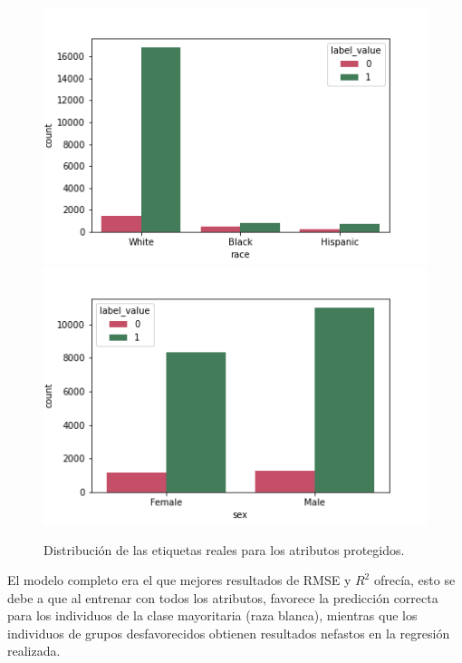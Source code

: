 \documentclass[oneside,openright,titlepage,numbers=noenddot,openany,headinclude,footinclude=true,
cleardoublepage=empty,abstractoff,BCOR=5mm,paper=a4,fontsize=12pt,main=spanish]{scrreprt}
\begin{document}
\begin{figure}[h]
      \includegraphics[width=\linewidth]{images/label_race_law_2.png}
    \endminipage\hfill
      \includegraphics[width=\linewidth]{images/label_sex_law_2.png}
    \endminipage
     \caption{Distribución de las etiquetas reales para los atributos protegidos.}
     \label{fig:labelracesex3}
\end{figure}

\clearpage

El modelo completo era el que mejores resultados de RMSE y $R^2$ ofrecía, esto se debe a que al entrenar con todos los atributos, favorece la predicción correcta para los individuos de la clase mayoritaria (raza blanca), mientras que los individuos de grupos desfavorecidos obtienen resultados nefastos en la regresión realizada.
\end{document}
